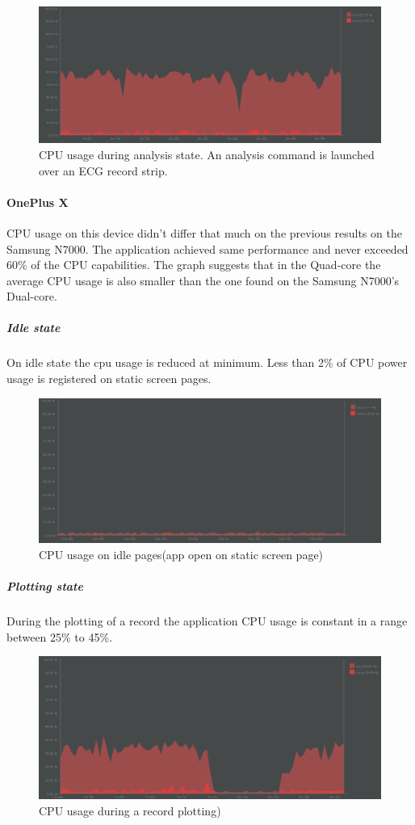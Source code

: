 \begin{figure}[h!]
	\centering	
	\includegraphics[width=1\linewidth]{figures/ch10/31.png}
	\caption{CPU usage during analysis state. An analysis command is launched over an ECG record strip.}  
	\label{fig10.31}
\end{figure}
\paragraph{OnePlus X}
CPU usage on this device didn’t differ that much on the previous results on the Samsung N7000. The application achieved same performance and never exceeded 60\% of the CPU capabilities. The graph suggests that in the Quad-core the average CPU usage is also smaller than the one found on the Samsung N7000’s Dual-core.
\subparagraph{Idle state}
On idle state the cpu usage is reduced at minimum. Less than 2\% of CPU power usage is registered on static screen pages.
\begin{figure}[h!]
	\centering	
	\includegraphics[width=1\linewidth]{figures/ch10/32.png}
	\caption{CPU usage on idle pages(app open on static screen page)}  
	\label{fig10.32}
\end{figure}
\subparagraph{Plotting state}
During the plotting of a record the application CPU usage is constant in  a range between 25\% to 45\%.
\begin{figure}[h!]
	\centering	
	\includegraphics[width=1\linewidth]{figures/ch10/33.png}
	\caption{CPU usage during a record plotting)}  
	\label{fig10.33}
\end{figure}
